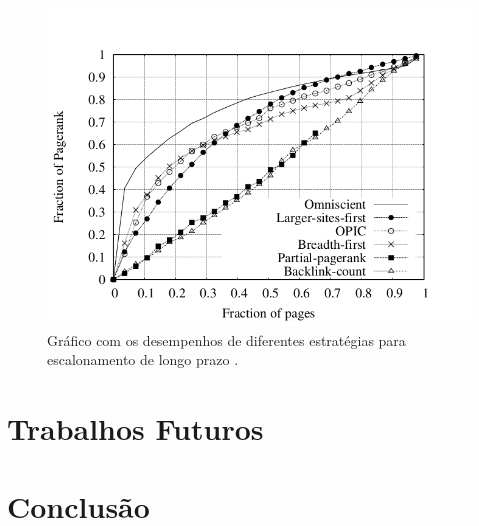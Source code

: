 \documentclass[a4paper,12pt,titlepage]{article}
\begin{document}
\begin{figure}[H]
     \centering
     \includegraphics[scale=0.45]{figures/performance.png}
     \caption{Gráfico com os desempenhos de diferentes estratégias para escalonamento de longo prazo  \cite{carlos}.}
     \label{bsp}
\end{figure}


\section{Trabalhos Futuros}
\section{Conclusão}


\newpage
\end{document}
